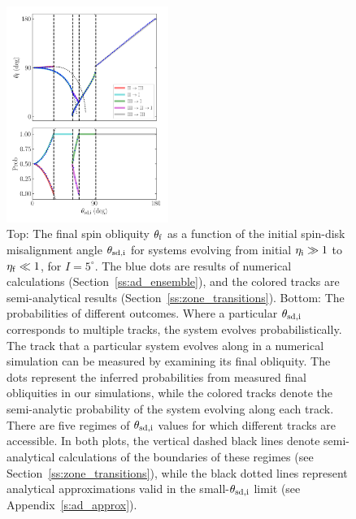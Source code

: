 \documentclass[twocolumn,twocolappendix]{aastex63}
\begin{document}
\begin{figure}
    \centering
    \includegraphics[width=0.47\textwidth]{plots_diskdisp/3_ensemble_05_35.png}
    \caption{Top: The final spin obliquity $\theta_{\rm f}$ as a function of the
    initial spin-disk misalignment angle $\theta_{\rm sd, i}$ for systems
    evolving from initial $\eta_{\rm i} \gg 1$ to $\eta_{\rm f} \ll 1$,
    \textcolor{Corr}{for $I = 5^\circ$}. The blue dots are results of numerical
    calculations (Section~\ref{ss:ad_ensemble}), and the colored tracks are
    semi-analytical results (Section~\ref{ss:zone_transitions}). Bottom: The
    probabilities of different outcomes. Where a particular $\theta_{\rm sd, i}$
    corresponds to multiple tracks, the system evolves probabilistically. The
    track that a particular system evolves along in a numerical simulation can
    be measured by examining its final obliquity. The dots represent the
    inferred probabilities from measured final obliquities in our simulations,
    while the colored tracks denote the semi-analytic probability of the system
    evolving along each track. There are five regimes of $\theta_{\rm sd, i}$
    values for which different tracks are accessible. In both plots, the
    vertical dashed black lines denote semi-analytical calculations of the
    boundaries of these regimes (see Section~\ref{ss:zone_transitions}), while
    the black dotted lines represent analytical approximations valid in the
    small-$\theta_{\rm sd, i}$ limit (see
    Appendix~\ref{s:ad_approx}).}\label{fig:ad_ensemble}
\end{figure}
\end{document}
